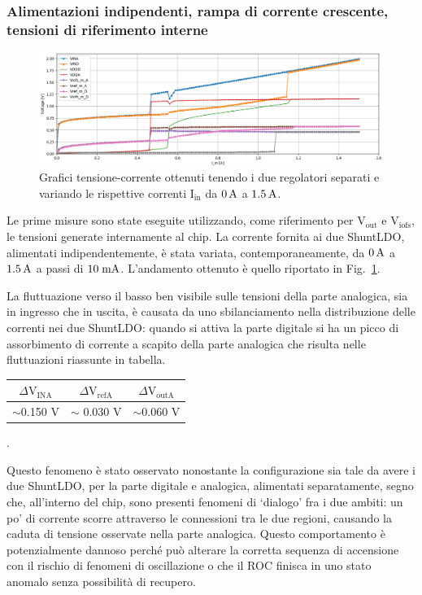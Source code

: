 \subsubsection{Alimentazioni indipendenti, rampa di corrente crescente, tensioni di riferimento interne}
\label{sec:iui}

\begin{figure}
\centering
\includegraphics[width=\textwidth]{Immagini/IUI2}
\caption{Grafici tensione-corrente ottenuti tenendo i due regolatori separati e variando le rispettive correnti $\mathrm{I_{in}}$ da $0\rm \, A$ a $1.5\rm \, A$.}%
\label{IUI}
\end{figure}
Le prime misure sono state eseguite utilizzando, come riferimento per $\mathrm{V_{out}}$ e $\mathrm{V_{iofs}}$, le tensioni generate internamente al chip.
La corrente fornita ai due ShuntLDO, alimentati indipendentemente, è stata variata, contemporaneamente, da $0\rm \, A$ a $1.5\rm \, A$ a passi di $10\rm \; mA$.
L'andamento ottenuto è quello riportato in Fig.~\ref{IUI}.

La fluttuazione verso il basso ben visibile sulle tensioni della parte analogica, sia in ingresso che in uscita, è causata da uno sbilanciamento nella distribuzione delle correnti nei due ShuntLDO: quando si attiva la parte digitale si ha un picco di assorbimento di corrente a scapito della parte analogica che risulta nelle fluttuazioni riassunte in tabella.
\begin{center}
\begin{tabular}{ccc}
\hline
$\Delta \mathrm{V_{INA}}$ & $\Delta \mathrm{V_{refA}}$ &$\Delta \mathrm{V_{outA}}$  \\ \hline
$\sim$0.150 V & $\sim$ 0.030 V& $\sim$0.060 V\\ \hline     
\end{tabular}.
\end{center}
Questo fenomeno è stato osservato nonostante la configurazione sia tale da avere i due ShuntLDO, per la parte digitale e analogica, alimentati separatamente, segno che, all'interno del chip, sono presenti fenomeni di `dialogo' fra i due ambiti: un po' di corrente scorre attraverso le connessioni tra le due regioni, causando la caduta di tensione osservate nella parte analogica.
Questo comportamento è potenzialmente dannoso perch\'e pu\`o alterare la corretta sequenza di accensione con il rischio di fenomeni di oscillazione o che il ROC finisca in uno stato anomalo senza possibilit\`a di recupero.

